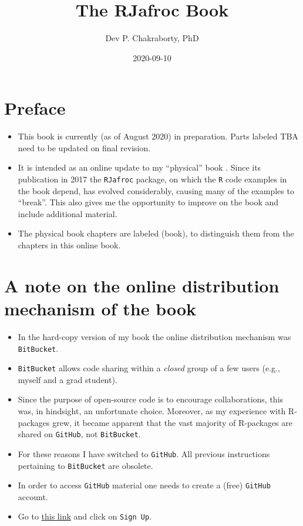 \documentclass[
]{book}
\title{The RJafroc Book}
\author{Dev P. Chakraborty, PhD}
\date{2020-09-10}
\providecommand{\tightlist}{%
  \setlength{\itemsep}{0pt}\setlength{\parskip}{0pt}}
\begin{document}
\maketitle

{
\setcounter{tocdepth}{1}
\tableofcontents
}
\hypertarget{preface}{%
\chapter*{Preface}\label{preface}}

\begin{itemize}
\tightlist
\item
  This book is currently (as of August 2020) in preparation. Parts labeled TBA need to be updated on final revision.
\item
  It is intended as an online update to my ``physical'' book \citep{RN2680}. Since its publication in 2017 the \texttt{RJafroc} package, on which the \texttt{R} code examples in the book depend, has evolved considerably, causing many of the examples to ``break''. This also gives me the opportunity to improve on the book and include additional material.
\item
  The physical book chapters are labeled (book), to distinguish them from the chapters in this online book.
\end{itemize}

\hypertarget{a-note-on-the-online-distribution-mechanism-of-the-book}{%
\chapter*{A note on the online distribution mechanism of the book}\label{a-note-on-the-online-distribution-mechanism-of-the-book}}

\begin{itemize}
\tightlist
\item
  In the hard-copy version of my book \citep{RN2680} the online distribution mechanism was \texttt{BitBucket}.
\item
  \texttt{BitBucket} allows code sharing within a \emph{closed} group of a few users (e.g., myself and a grad student).
\item
  Since the purpose of open-source code is to encourage collaborations, this was, in hindsight, an unfortunate choice. Moreover, as my experience with R-packages grew, it became apparent that the vast majority of R-packages are shared on \texttt{GitHub}, not \texttt{BitBucket}.
\item
  For these reasons I have switched to \texttt{GitHub}. All previous instructions pertaining to \texttt{BitBucket} are obsolete.
\item
  In order to access \texttt{GitHub} material one needs to create a (free) \texttt{GitHub} account.
\item
  Go to \href{https://github.com}{this link} and click on \texttt{Sign\ Up}.
\end{itemize}
\end{document}
